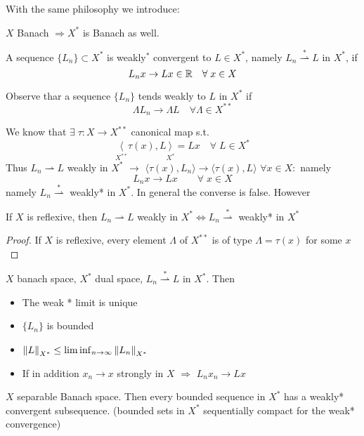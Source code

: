 With the same philosophy we introduce: 
\begin{definition}
    \(X \) Banach \(\Rightarrow X^* \) is Banach as well.
\end{definition}
\begin{definition}
    A sequence \(\{L_n \} \subset X^*\) is weakly\(^*\) convergent to \(L \in  X^*\), namely \(L_n \overset{*}{\rightharpoonup} L\) in \(X^*\), if 
    \[
        L_n x \to Lx \in \mathbb{R} \quad \forall\; x \in X
    \]
\end{definition}
\begin{remark}
    Observe thar a sequence \(\{L_n\} \) tends weakly to \(L\) in \(X^*\) if 
    \[
        \Lambda L_n \to \Lambda L \quad \forall \Lambda \in X^{**}
    \]
\end{remark}
We know that \(\exists \; \tau:X \to X^{**}\) canonical map s.t. 
\[
    \underset{X^{**}}{\langle}\tau(x), L \underset{X^*}{\rangle} = Lx \quad \forall \; L \in X^*
\]
Thus \(L_n \rightharpoonup L\) weakly in \(X^*\) \(\rightarrow\) \(\langle \tau(x), L_n \rangle \to \langle \tau(x), L \rangle\) \(\forall x \in X:\) namely
\[
    L_n x \to Lx \qquad \forall \; x \in X
\]
namely \(L_n \overset{*}{\rightharpoonup}\) weakly* in \(X^*\). In general the converse is false. However
\begin{proposition}
    If \(X\) is reflexive, then \(L_n \rightharpoonup L\) weakly in \(X^* \iff L_n \overset{*}{\rightharpoonup}\) weakly* in \(X^*\)
\end{proposition}
\begin{proof}
    If \(X\) is reflexive, every element \(\Lambda\) of \(X^{**}\) is of type \(\Lambda = \tau(x)\) for some \(x\)
\end{proof}
\begin{proposition}
    \(X\) banach space, \(X^*\) dual space, \(L_n \overset{*}{\rightharpoonup} L\) in \(X^*\). Then
    \begin{itemize}
        \item The weak * limit is unique
        \item \(\{L_n\}\) is bounded
        \item \(\norm{L}_{X^*} \leq \liminf _{n \to \infty} \norm{L_n}_{X^*}\)
        \item If in addition \(x_n \to x\) strongly in \(X\) \(\Rightarrow\) \(L_nx_n \to Lx\) 
    \end{itemize}
\end{proposition}

\begin{theorem}
    \(X \) separable Banach space. Then every bounded sequence in \(X^*\) has a weakly* convergent subsequence. (bounded sets in \(X^* \) sequentially compact for the weak* convergence)
\end{theorem}

